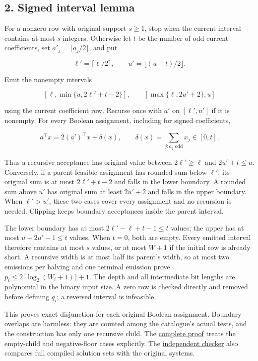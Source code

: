 \hypertarget{af-c97649ed9d-signed-interval-lemma}{%
\subsection{2. Signed interval lemma}\label{af-c97649ed9d-signed-interval-lemma}}

For a nonzero row with original support \(s\ge1\), stop when the current interval contains at most \(s\) integers. Otherwise let \(t\) be the number of odd current coefficients, set \(a'_j=\lfloor a_j/2\rfloor\), and put

\[
\ell'=\lceil\ell/2\rceil,\qquad u'=\lfloor(u-t)/2\rfloor.
\]

Emit the nonempty intervals

\[
[\ell,\min\{u,2\ell'+t-2\}],\qquad
[\max\{\ell,2u'+2\},u]
\]

using the current coefficient row. Recurse once with \(a'\) on \([\ell',u']\) if it is nonempty. For every Boolean assignment, including for signed coefficients,

\[
a^\top x=2(a')^\top x+\delta(x),\qquad
\delta(x)=\sum_{j:a_j\text{ odd}}x_j\in[0,t].
\]

Thus a recursive acceptance has original value between \(2\ell'\ge\ell\) and \(2u'+t\le u\). Conversely, if a parent-feasible assignment has rounded sum below \(\ell'\), its original sum is at most \(2\ell'+t-2\) and falls in the lower boundary. A rounded sum above \(u'\) has original sum at least \(2u'+2\) and falls in the upper boundary. When \(\ell'>u'\), these two cases cover every assignment and no recursion is needed. Clipping keeps boundary acceptances inside the parent interval.

The lower boundary has at most \(2\ell'-\ell+t-1\le t\) values; the upper has at most \(u-2u'-1\le t\) values. When \(t=0\), both are empty. Every emitted interval therefore contains at most \(s\) values, or at most \(W+1\) if the initial row is already short. A recursive width is at most half its parent's width, so at most two emissions per halving and one terminal emission prove \(p_i\le2\lceil\log_2(W_i+1)\rceil+1\). The depth and all intermediate bit lengths are polynomial in the binary input size. A zero row is checked directly and removed before defining \(q_i\); a reversed interval is infeasible.

This proves exact disjunction for each original Boolean assignment. Boundary overlaps are harmless: they are counted among the catalogue's actual tests, and the construction has only one recursive child. The \href{https://github.com/icekylinx/algorithm-frontier/blob/main/problems/boolean-linear-compiler/manuscripts/boolean-linear-optimization-compiler.md\#2-signed-short-interval-catalogue}{complete proof} treats the empty-child and negative-floor cases explicitly. The \href{https://github.com/icekylinx/algorithm-frontier/blob/main/problems/boolean-linear-compiler/verify/check_interval_compiler.py}{independent checker} also compares full compiled solution sets with the original systems.

